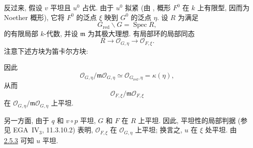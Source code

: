 反过来, 假设 \(v\) 平坦且 \(u^0\) 占优.
由于 \(u^0\) 拟紧 (由 ,
概形 \(F^0\) 在 \(k\) 上有限型, 因而为 Noether 概形),
它将 \(F^0\) 的泛点 \(\xi\) 映到 \(G^0\) 的泛点 \(\eta\).
设 \(R\) 为满足
\[
  G_{\mathrm{red}}\backslash G=\operatorname{Spec}R,
\]
的有限局部 \(k\)-代数, 并设 \(\mathfrak m\) 为其极大理想.
有局部环的局部同态
\[
  R\longrightarrow\mathcal O_{G,\eta}
   \longrightarrow\mathcal O_{F,\xi}.
\]
注意下述方块为笛卡尔方块:
\begin{center}
  \label{diag:sga3-VIA-5.6.2-local-flatness}%
\end{center}
因此
\[
  \mathcal O_{G,\eta}/\mathfrak m\mathcal O_{G,\eta}
    \simeq \mathcal O_{G_{\mathrm{red}},\eta}
    =\kappa(\eta),
\]
从而
\[
  \mathcal O_{F,\xi}/\mathfrak m\mathcal O_{F,\xi}
\]
在 \(\mathcal O_{G,\eta}/\mathfrak m\mathcal O_{G,\eta}\) 上平坦.

另一方面, 由于 \(q\) 和 \(v\circ p\) 平坦,
\(G\) 和 \(F\) 在 \(R\) 上平坦.
因此, 平坦性的局部判据 (参见 EGA~IV\(_3\), 11.3.10.2) 表明,
\(\mathcal O_{F,\xi}\) 在 \(\mathcal O_{G,\eta}\) 上平坦;
换言之, \(u\) 在 \(\xi\) 处平坦.
由 \hyperref[lem:sga3-VIA-2.5.3]{2.5.3} 可知 \(u\) 平坦.
